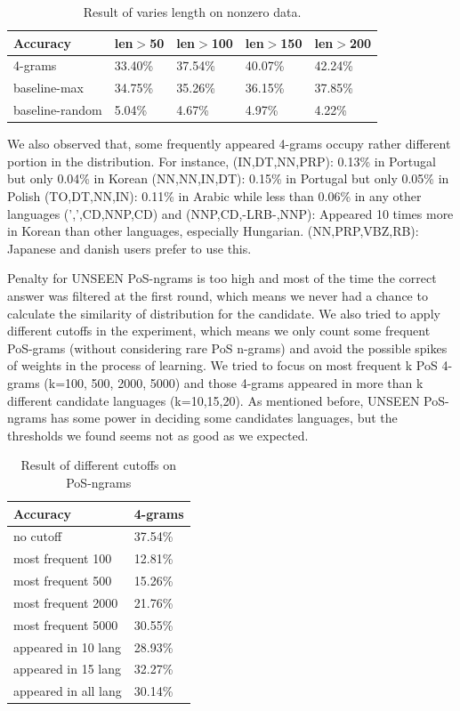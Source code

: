 \documentclass[11pt]{article}
\begin{document}
\begin{table}[h]
\begin{center}
\small\addtolength{\tabcolsep}{-5pt}
\begin{tabular}{|l|l|l|l|l|}
\hline Accuracy & \bf len$>$50 & \bf len$>$100 & \bf len$>$150 & \bf len$>$200 \\ \hline
4-grams & 33.40\% & 37.54\%  & 40.07\% & 42.24\% \\
baseline-max  & 34.75\% & 35.26\% & 36.15\% & 37.85\% \\
baseline-random  & 5.04\% & 4.67\% & 4.97\% & 4.22\% \\
\hline
\end{tabular}
\end{center}
\caption{\label{font-table} Result of varies length on nonzero data. }
\end{table}

We also observed that, some frequently appeared 4-grams occupy rather different portion in the distribution. For instance,
(IN,DT,NN,PRP): 0.13\% in Portugal but only 0.04\% in Korean
(NN,NN,IN,DT): 0.15\% in Portugal but only 0.05\% in Polish
(TO,DT,NN,IN): 0.11\% in Arabic while less than 0.06\% in any other languages
(',',CD,NNP,CD) and (NNP,CD,-LRB-,NNP): Appeared 10 times more in Korean than other languages, especially Hungarian.
(NN,PRP,VBZ,RB): Japanese and danish users prefer to use this.
 
Penalty for UNSEEN PoS-ngrams is too high and most of the time the correct answer was filtered at the first round, which means we never had a chance to calculate the similarity of distribution for the candidate. We also tried to apply different cutoffs in the experiment, which means we only count some frequent PoS-grams (without considering rare PoS n-grams) and avoid the possible spikes of weights in the process of learning. We tried to focus on most frequent k PoS 4-grams (k=100, 500, 2000, 5000) and those 4-grams appeared in more than k different candidate languages (k=10,15,20). As mentioned before, UNSEEN PoS-ngrams has some power in deciding some candidates languages, but the thresholds we found seems not as good as we expected.

\begin{table}[h]
\begin{center}
\small\addtolength{\tabcolsep}{-5pt}
\begin{tabular}{|l|l|}
\hline Accuracy & \bf 4-grams \\ \hline
no cutoff  &  37.54\% \\
most frequent 100 & 12.81\% \\
most frequent 500 & 15.26\% \\
most frequent 2000 & 21.76\% \\
most frequent 5000 & 30.55\% \\
appeared in 10 lang & 28.93\% \\
appeared in 15 lang & 32.27\% \\
appeared in all lang & 30.14\% \\
\hline
\end{tabular}
\end{center}
\caption{\label{font-table} Result of different cutoffs on PoS-ngrams }
\end{table}
\end{document}
